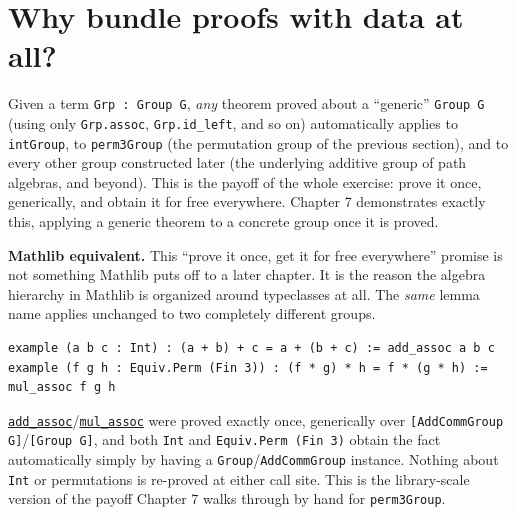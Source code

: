 \section{Why bundle proofs with data at all?}\label{sec:06-groups:06-why-bundle:1}

Given a term \texttt{Grp : Group G}, \emph{any} theorem proved about a ``generic'' \texttt{Group G} (using only \texttt{Grp.assoc}, \texttt{Grp.id\_\allowbreak{}left}, and so on) automatically applies to \texttt{intGroup}, to \texttt{perm3Group} (the permutation group of the previous section), and to every other group constructed later (the underlying additive group of path algebras, and beyond). This is the payoff of the whole exercise: prove it once, generically, and obtain it for free everywhere. Chapter 7 demonstrates exactly this, applying a generic theorem to a concrete group once it is proved.

\textbf{Mathlib equivalent.} This ``prove it once, get it for free everywhere'' promise is not something Mathlib puts off to a later chapter. It is the reason the algebra hierarchy in Mathlib is organized around typeclasses at all. The \emph{same} lemma name applies unchanged to two completely different groups.

\begin{lstlisting}
example (a b c : Int) : (a + b) + c = a + (b + c) := add_assoc a b c
example (f g h : Equiv.Perm (Fin 3)) : (f * g) * h = f * (g * h) := mul_assoc f g h
\end{lstlisting}

\href{https://loogle.lean-lang.org/?q=add_assoc}{\texttt{add\_\allowbreak{}assoc}}/\href{https://loogle.lean-lang.org/?q=mul_assoc}{\texttt{mul\_\allowbreak{}assoc}} were proved exactly once, generically over \texttt{[AddCommGroup G]}/\texttt{[Group G]}, and both \texttt{Int} and \texttt{Equiv.Perm (Fin 3)} obtain the fact automatically simply by having a \texttt{Group}/\texttt{AddCommGroup} instance. Nothing about \texttt{Int} or permutations is re-proved at either call site. This is the library-scale version of the payoff Chapter 7 walks through by hand for \texttt{perm3Group}.
